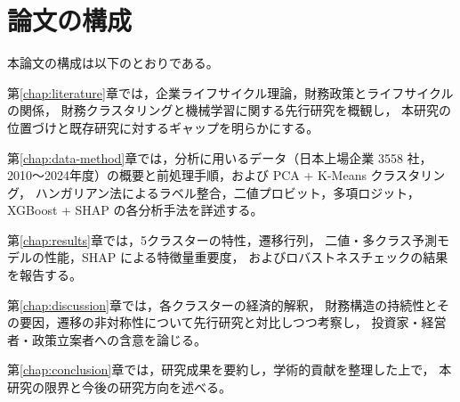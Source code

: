 \section{論文の構成}
\label{sec:intro-structure}

本論文の構成は以下のとおりである。

第\ref{chap:literature}章では，企業ライフサイクル理論，財務政策とライフサイクルの関係，
財務クラスタリングと機械学習に関する先行研究を概観し，
本研究の位置づけと既存研究に対するギャップを明らかにする。

第\ref{chap:data-method}章では，分析に用いるデータ（日本上場企業 \num{3558} 社，
2010〜2024年度）の概要と前処理手順，および PCA + K-Means クラスタリング，
ハンガリアン法によるラベル整合，二値プロビット，多項ロジット，
XGBoost + SHAP の各分析手法を詳述する。

第\ref{chap:results}章では，5クラスターの特性，遷移行列，
二値・多クラス予測モデルの性能，SHAP による特徴量重要度，
およびロバストネスチェックの結果を報告する。

第\ref{chap:discussion}章では，各クラスターの経済的解釈，
財務構造の持続性とその要因，遷移の非対称性について先行研究と対比しつつ考察し，
投資家・経営者・政策立案者への含意を論じる。

第\ref{chap:conclusion}章では，研究成果を要約し，学術的貢献を整理した上で，
本研究の限界と今後の研究方向を述べる。
